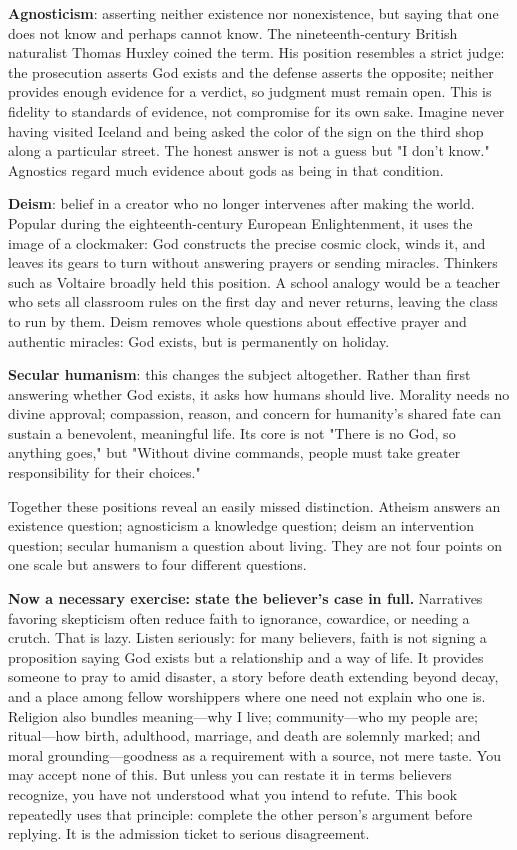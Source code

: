 \textbf{Agnosticism}: asserting neither existence nor nonexistence, but saying that one does not know and perhaps cannot know. The nineteenth-century British naturalist Thomas Huxley coined the term. His position resembles a strict judge: the prosecution asserts God exists and the defense asserts the opposite; neither provides enough evidence for a verdict, so judgment must remain open. This is fidelity to standards of evidence, not compromise for its own sake. Imagine never having visited Iceland and being asked the color of the sign on the third shop along a particular street. The honest answer is not a guess but "I don't know." Agnostics regard much evidence about gods as being in that condition.

\textbf{Deism}: belief in a creator who no longer intervenes after making the world. Popular during the eighteenth-century European Enlightenment, it uses the image of a clockmaker: God constructs the precise cosmic clock, winds it, and leaves its gears to turn without answering prayers or sending miracles. Thinkers such as Voltaire broadly held this position. A school analogy would be a teacher who sets all classroom rules on the first day and never returns, leaving the class to run by them. Deism removes whole questions about effective prayer and authentic miracles: God exists, but is permanently on holiday.

\textbf{Secular humanism}: this changes the subject altogether. Rather than first answering whether God exists, it asks how humans should live. Morality needs no divine approval; compassion, reason, and concern for humanity's shared fate can sustain a benevolent, meaningful life. Its core is not "There is no God, so anything goes," but "Without divine commands, people must take greater responsibility for their choices."

Together these positions reveal an easily missed distinction. Atheism answers an existence question; agnosticism a knowledge question; deism an intervention question; secular humanism a question about living. They are not four points on one scale but answers to four different questions.

\textbf{Now a necessary exercise: state the believer's case in full.} Narratives favoring skepticism often reduce faith to ignorance, cowardice, or needing a crutch. That is lazy. Listen seriously: for many believers, faith is not signing a proposition saying God exists but a relationship and a way of life. It provides someone to pray to amid disaster, a story before death extending beyond decay, and a place among fellow worshippers where one need not explain who one is. Religion also bundles meaning---why I live; community---who my people are; ritual---how birth, adulthood, marriage, and death are solemnly marked; and moral grounding---goodness as a requirement with a source, not mere taste. You may accept none of this. But unless you can restate it in terms believers recognize, you have not understood what you intend to refute. This book repeatedly uses that principle: complete the other person's argument before replying. It is the admission ticket to serious disagreement.

